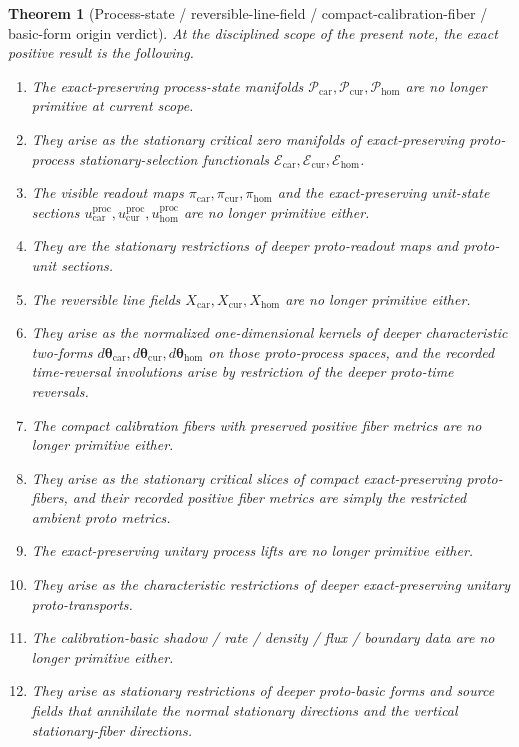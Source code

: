 \documentclass[11pt]{article}
\newcommand{\TensorProcSpace}{\mathcal P_{\mathrm{car}}}
\newcommand{\CurProcSpace}{\mathcal P_{\mathrm{cur}}}
\newcommand{\HomProcSpace}{\mathcal P_{\mathrm{hom}}}
\newcommand{\TensorProcRead}{\pi_{\mathrm{car}}}
\newcommand{\CurProcRead}{\pi_{\mathrm{cur}}}
\newcommand{\HomProcRead}{\pi_{\mathrm{hom}}}
\newcommand{\TensorProcUnit}{u_{\mathrm{car}}^{\mathrm{proc}}}
\newcommand{\CurProcUnit}{u_{\mathrm{cur}}^{\mathrm{proc}}}
\newcommand{\HomProcUnit}{u_{\mathrm{hom}}^{\mathrm{proc}}}
\newcommand{\TensorFlowField}{X_{\mathrm{car}}}
\newcommand{\CurFlowField}{X_{\mathrm{cur}}}
\newcommand{\HomFlowField}{X_{\mathrm{hom}}}
\newcommand{\TensorSelection}{\mathscr E_{\mathrm{car}}}
\newcommand{\CurSelection}{\mathscr E_{\mathrm{cur}}}
\newcommand{\HomSelection}{\mathscr E_{\mathrm{hom}}}
\newcommand{\TensorCharForm}{\boldsymbol{\theta}_{\mathrm{car}}}
\newcommand{\CurCharForm}{\boldsymbol{\theta}_{\mathrm{cur}}}
\newcommand{\HomCharForm}{\boldsymbol{\theta}_{\mathrm{hom}}}
\newtheorem{theorem}{Theorem}
\begin{document}
\begin{theorem}[Process-state / reversible-line-field / compact-calibration-fiber / basic-form origin verdict]
\label{thm:verdict}
At the disciplined scope of the present note, the exact positive result is the following.
\begin{enumerate}
    \item The exact-preserving process-state manifolds \(\TensorProcSpace,\CurProcSpace,\HomProcSpace\) are no longer primitive at current scope.
    \item They arise as the stationary critical zero manifolds of exact-preserving proto-process stationary-selection functionals \(\TensorSelection,\CurSelection,\HomSelection\).
    \item The visible readout maps \(\TensorProcRead,\CurProcRead,\HomProcRead\) and the exact-preserving unit-state sections \(\TensorProcUnit,\CurProcUnit,\HomProcUnit\) are no longer primitive either.
    \item They are the stationary restrictions of deeper proto-readout maps and proto-unit sections.
    \item The reversible line fields \(\TensorFlowField,\CurFlowField,\HomFlowField\) are no longer primitive either.
    \item They arise as the normalized one-dimensional kernels of deeper characteristic two-forms \(d\TensorCharForm,d\CurCharForm,d\HomCharForm\) on those proto-process spaces, and the recorded time-reversal involutions arise by restriction of the deeper proto-time reversals.
    \item The compact calibration fibers with preserved positive fiber metrics are no longer primitive either.
    \item They arise as the stationary critical slices of compact exact-preserving proto-fibers, and their recorded positive fiber metrics are simply the restricted ambient proto metrics.
    \item The exact-preserving unitary process lifts are no longer primitive either.
    \item They arise as the characteristic restrictions of deeper exact-preserving unitary proto-transports.
    \item The calibration-basic shadow / rate / density / flux / boundary data are no longer primitive either.
    \item They arise as stationary restrictions of deeper proto-basic forms and source fields that annihilate the normal stationary directions and the vertical stationary-fiber directions.

\end{enumerate}
\end{theorem}
\end{document}

